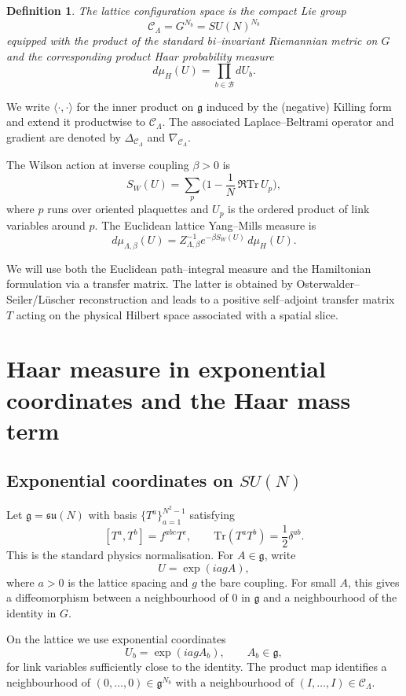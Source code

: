 \documentclass[11pt]{article}
\numberwithin{equation}{section}
\newtheorem{definition}[theorem]{Definition}
\begin{document}
\begin{definition}
The \emph{lattice configuration space} is the compact Lie group
\[
  \mathcal{C}_\Lambda = G^{N_b} = SU(N)^{N_b}
\]
equipped with the product of the standard bi--invariant Riemannian
metric on $G$ and the corresponding product Haar probability measure
\[
  d\mu_H(U) = \prod_{b\in\mathcal{B}} dU_b.
\]
\end{definition}

We write $\langle\cdot,\cdot\rangle$ for the inner product on
$\mathfrak{g}$ induced by the (negative) Killing form and extend it
productwise to $\mathcal{C}_\Lambda$.  The associated Laplace--Beltrami
operator and gradient are denoted by $\Delta_{\mathcal{C}_\Lambda}$ and
$\nabla_{\mathcal{C}_\Lambda}$.

The Wilson action at inverse coupling $\beta>0$ is
\[
  S_W(U) = \sum_{p} \Big(1 - \frac{1}{N}\,\Re\mathrm{Tr}\,U_p\Big),
\]
where $p$ runs over oriented plaquettes and $U_p$ is the ordered product
of link variables around $p$.  The Euclidean lattice Yang--Mills measure
is
\[
  d\mu_{\Lambda,\beta}(U)
  = Z_{\Lambda,\beta}^{-1} e^{-\beta S_W(U)}\,d\mu_H(U).
\]

We will use both the Euclidean path--integral measure and the Hamiltonian
formulation via a transfer matrix.  The latter is obtained by
Osterwalder--Seiler/L\"uscher reconstruction and leads to a positive
self--adjoint transfer matrix $T$ acting on the physical Hilbert space
associated with a spatial slice.

\section{Haar measure in exponential coordinates and the Haar mass term}

\subsection{Exponential coordinates on $SU(N)$}

Let $\mathfrak{g} = \mathfrak{su}(N)$ with basis
$\{T^a\}_{a=1}^{N^2-1}$ satisfying
\[
  [T^a,T^b] = f^{abc} T^c,\qquad
  \mathrm{Tr}(T^a T^b) = \frac{1}{2}\delta^{ab}.
\]
This is the standard physics normalisation.  For $A\in\mathfrak{g}$,
write
\[
  U = \exp(iagA),
\]
where $a>0$ is the lattice spacing and $g$ the bare coupling.  For small
$A$, this gives a diffeomorphism between a neighbourhood of $0$ in
$\mathfrak{g}$ and a neighbourhood of the identity in $G$.

On the lattice we use exponential coordinates
\[
  U_b = \exp(iagA_b),\qquad A_b\in\mathfrak{g},
\]
for link variables sufficiently close to the identity.  The product map
identifies a neighbourhood of $(0,\dots,0)\in\mathfrak{g}^{N_b}$ with a
neighbourhood of $(I,\dots,I)\in \mathcal{C}_\Lambda$.
\end{document}
